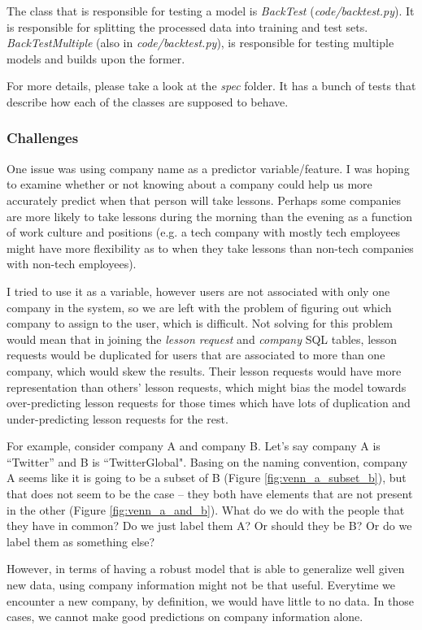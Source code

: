 \documentclass[oneside]{article}
\begin{document}
The class that is responsible for testing a model is \emph{BackTest}
(\emph{code/backtest.py}). It is responsible for splitting the processed data
into training and test sets.  \emph{BackTestMultiple} (also in
\emph{code/backtest.py}), is responsible for testing multiple models and builds
upon the former.

For more details, please take a look at the \emph{spec} folder. It has a bunch
of tests that describe how each of the classes are supposed to behave.


\subsubsection{Challenges}

One issue was using company name as a predictor variable/feature.  I was hoping
to examine whether or not knowing about a company could help us more accurately
predict when that person will take lessons.  Perhaps some companies are more
likely to take lessons during the morning than the evening as a function of
work culture and positions (e.g. a tech company with mostly tech employees
might have more flexibility as to when they take lessons than non-tech
companies with non-tech employees).

I tried to use it as a variable, however users are not associated with only one
company in the system, so we are left with the problem of figuring out which
company to assign to the user, which is difficult. Not solving for this problem
would mean that in joining the \emph{lesson request} and \emph{company} SQL
tables, lesson requests would be duplicated for users that are associated to
more than one company, which would skew the results. Their lesson requests
would have more representation than others' lesson requests, which might bias
the model towards over-predicting lesson requests for those times which have
lots of duplication and under-predicting lesson requests for the rest.

For example, consider company A and company B. Let's say company A is
``Twitter'' and B is ``TwitterGlobal". Basing on the naming convention, company
A seems like it is going to be a subset of B (Figure
\ref{fig:venn_a_subset_b}), but that does not seem to be the case -- they both
have elements that are not present in the other (Figure
\ref{fig:venn_a_and_b}).  What do we do with the people that they have in
common? Do we just label them A? Or should they be B? Or do we label them as
something else?

However, in terms of having a robust model that is able to generalize well
given new data, using company information might not be that useful. Everytime
we encounter a new company, by definition, we would have little to no data. In
those cases, we cannot make good predictions on company information alone.
\end{document}
